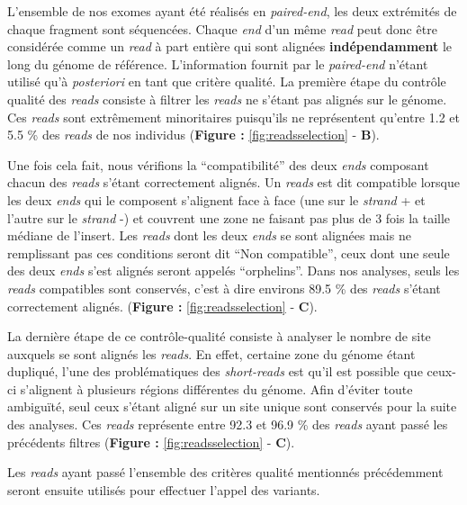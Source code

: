 \documentclass[12pt,twoside]{reedthesis}
\theoremstyle{definition}
\theoremstyle{definition}
\theoremstyle{remark}
\begin{document}
  L'ensemble de nos exomes ayant été réalisés en \emph{paired-end}, les
  deux extrémités de chaque fragment sont séquencées. Chaque \emph{end}
  d'un même \emph{read} peut donc être considérée comme un \emph{read} à
  part entière qui sont alignées \textbf{indépendamment} le long du génome
  de référence. L'information fournit par le \emph{paired-end} n'étant
  utilisé qu'à \emph{posteriori} en tant que critère qualité. La première
  étape du contrôle qualité des \emph{reads} consiste à filtrer les
  \emph{reads} ne s'étant pas alignés sur le génome. Ces \emph{reads} sont
  extrêmement minoritaires puisqu'ils ne représentent qu'entre 1.2 et 5.5
  \% des \emph{reads} de nos individus (\textbf{Figure :
  }\ref{fig:readsselection} - \textbf{B}).
  
  Une fois cela fait, nous vérifions la ``compatibilité'' des deux
  \emph{ends} composant chacun des \emph{reads} s'étant correctement
  alignés. Un \emph{reads} est dit compatible lorsque les deux \emph{ends}
  qui le composent s'alignent face à face (une sur le \emph{strand} + et
  l'autre sur le \emph{strand} -) et couvrent une zone ne faisant pas plus
  de 3 fois la taille médiane de l'insert. Les \emph{reads} dont les deux
  \emph{ends} se sont alignées mais ne remplissant pas ces conditions
  seront dit ``Non compatible'', ceux dont une seule des deux \emph{ends}
  s'est alignés seront appelés ``orphelins''. Dans nos analyses, seuls les
  \emph{reads} compatibles sont conservés, c'est à dire environs 89.5 \%
  des \emph{reads} s'étant correctement alignés. (\textbf{Figure :
  }\ref{fig:readsselection} - \textbf{C}).
  
  La dernière étape de ce contrôle-qualité consiste à analyser le nombre
  de site auxquels se sont alignés les \emph{reads}. En effet, certaine
  zone du génome étant dupliqué, l'une des problématiques des
  \emph{short-reads} est qu'il est possible que ceux-ci s'alignent à
  plusieurs régions différentes du génome. Afin d'éviter toute ambiguïté,
  seul ceux s'étant aligné sur un site unique sont conservés pour la suite
  des analyses. Ces \emph{reads} représente entre 92.3 et 96.9 \% des
  \emph{reads} ayant passé les précédents filtres (\textbf{Figure :
  }\ref{fig:readsselection} - \textbf{C}).
  
  Les \emph{reads} ayant passé l'ensemble des critères qualité mentionnés
  précédemment seront ensuite utilisés pour effectuer l'appel des
  variants.
  
  \newpage
  
\end{document}
